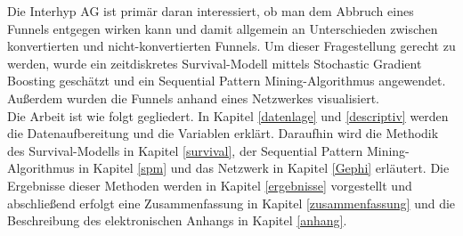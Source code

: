 Die Interhyp AG ist primär daran interessiert, ob man dem Abbruch eines Funnels entgegen wirken kann und damit allgemein an Unterschieden zwischen konvertierten und nicht-konvertierten Funnels. Um dieser Fragestellung gerecht zu werden, wurde ein zeitdiskretes Survival-Modell mittels Stochastic Gradient Boosting geschätzt und ein Sequential Pattern Mining-Algorithmus angewendet. Außerdem wurden die Funnels anhand eines Netzwerkes visualisiert.\\
Die Arbeit ist wie folgt gegliedert. In Kapitel \ref{datenlage} und \ref{descriptiv} werden die Datenaufbereitung und die Variablen erklärt. Daraufhin wird die Methodik des Survival-Modells in Kapitel \ref{survival}, der Sequential Pattern Mining-Algorithmus in Kapitel \ref{spm} und das Netzwerk in Kapitel \ref{Gephi} erläutert. Die Ergebnisse dieser Methoden werden in Kapitel \ref{ergebnisse} vorgestellt und abschließend erfolgt eine Zusammenfassung in Kapitel \ref{zusammenfassung} und die Beschreibung des elektronischen Anhangs in Kapitel \ref{anhang}.